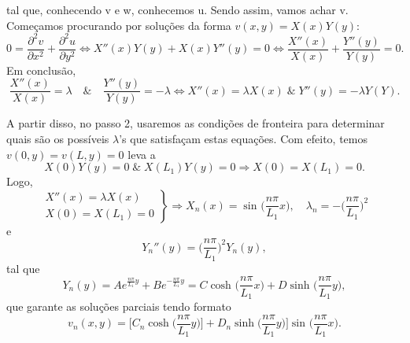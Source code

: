 \documentclass[../pde_notes.tex]{subfiles}
\begin{document}
tal que, conhecendo v e w, conhecemos u. Sendo assim, vamos achar v. Começamos procurando por soluções da forma \(v(x, y) = X(x)Y(y)\):
\[
	0 = \frac{\partial^{2}v}{\partial x^{2}} + \frac{\partial^{2}u}{\partial y^{2}} \Longleftrightarrow X''(x)Y(y) + X(x)Y''(y) = 0 \Longleftrightarrow \frac{X''(x)}{X(x)} + \frac{Y''(y)}{Y(y)} = 0.
\]
Em conclusão,
\[
	\frac{X''(x)}{X(x)} = \lambda \quad\&\quad \frac{Y''(y)}{Y(y)} = -\lambda \Longleftrightarrow X''(x) = \lambda X(x) \;\&\; Y''(y) = -\lambda Y(Y).
\]

A partir disso, no passo 2, usaremos as condições de fronteira para determinar quais são os possíveis \(\lambda \)'s que satisfaçam estas equações. Com efeito, temos \(v(0, y) = v(L, y) = 0\) leva a
\[
	X(0)Y(y) = 0 \;\&\; X(L_1)Y(y)=0 \Rightarrow X(0) = X(L_1) = 0.
\]
Logo,
\[
	\left.\begin{array}{ll}
		X''(x) = \lambda X(x) \\
		X(0) = X(L_1) = 0
	\end{array}\right\} \Rightarrow X_{n}(x) = \sin^{}{\biggl(\frac{n\pi }{L_1}x\biggr)},\quad \lambda_{n} = -\biggl(\frac{n\pi }{L_1}\biggr)^{2}
\]
e
\[
	Y_{n}''(y) = \biggl(\frac{n\pi }{L_1}\biggr)^{2}Y_{n}(y),
\]
tal que
\[
	Y_{n}(y) = Ae^{\frac{n\pi }{L_1}y} + Be^{-\frac{n\pi }{L_1}y} = C \cosh^{}{\biggl(\frac{n\pi }{L_1}x\biggr)} + D\sinh^{}{\biggl(\frac{n\pi }{L_1}y\biggr)},
\]
que garante as soluções parciais tendo formato
\[
	v_{n}(x, y) = \biggl[C_{n}\cosh \biggl(\frac{n\pi }{L_1}y\biggr)] + D_{n}\sinh \biggl(\frac{n\pi }{L_1}y\biggr)\biggr]\sin^{}{\biggl(\frac{n\pi }{L_1}x\biggr)}.
\]
\end{document}
